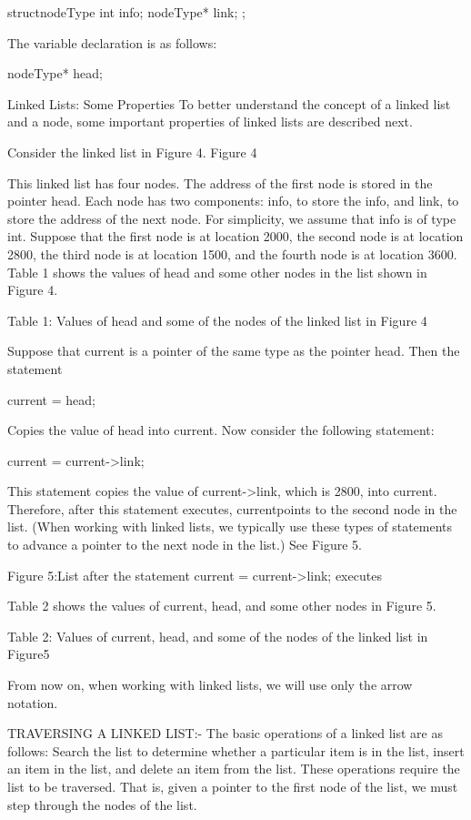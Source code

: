 \documentclass[11pt]{article}            %
\begin{document}
		structnodeType
{   int info;   nodeType* link;   
	 };	

The variable declaration is as follows: 

nodeType* head; 

Linked Lists: Some Properties 
To better understand the concept of a linked list and a node, some important properties of linked lists are described next. 

Consider the linked list in Figure 4. 
 Figure 4 


This linked list has four nodes. The address of the first node is stored in the pointer head. Each node has two components: info, to store the info, and link, to store the address of the next node. For simplicity, we assume that info is of type int. Suppose that the first node is at location 2000, the second node is at location 2800, the third node is at location 1500, and the fourth node is at location 3600. Table 1 shows the values of head and some other nodes in the list shown in Figure 4. 

Table 1: Values of head and some of the nodes of the linked list in Figure 4 

 

Suppose that current is a pointer of the same type as the pointer head. Then the statement 

		current = head; 

Copies the value of head into current. Now consider the following statement: 

current = current->link; 

This statement copies the value of current->link, which is 2800, into current. Therefore, after this statement executes, currentpoints to the second node in the list. (When working with linked lists, we typically use these types of statements to advance a pointer to the next node in the list.) See Figure 5. 

 
Figure 5:List after the statement current = current->link; executes 

		Table 2 shows the values of current, head, and some other nodes in Figure 5. 
	
Table 2: Values of current, head, and some of the nodes of the linked list in Figure5 

 

From now on, when working with linked lists, we will use only the arrow notation. 

TRAVERSING A LINKED LIST:- 
The basic operations of a linked list are as follows: Search the list to determine whether a particular item is in the list, insert an item in the list, and delete an item from the list. These operations require the list to be traversed. That is, given a pointer to the first node of the list, we must step through the nodes of the list. 
\end{document}
